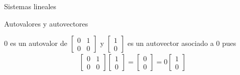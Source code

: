 \begin{chapter}{Sistemas lineales}
\begin{section}{Autovalores y autovectores}
        \begin{ejemplo*}
        $0$ es un autovalor de  
        $\left[\begin{array}{cc}
                    0&1\\0&0
                    \end{array}
        \right]$
        y $\left[\begin{array}{c}
                    1\\0
                    \end{array}
        \right]$ es un autovector asociado a $0$ pues
        \begin{align*}
        \left[\begin{array}{cc}
                    0&1\\0&0
                    \end{array}
        \right]
        \left[
        \begin{array}{c}
        1\\0 
        \end{array}
        \right]
        =
        \left[
        \begin{array}{c}
        0\\0 
        \end{array}
        \right]=
        0\left[
        \begin{array}{c}
        1\\0 
        \end{array}
        \right]
        \end{align*}
        \end{ejemplo*}


\end{section}
\end{chapter}
